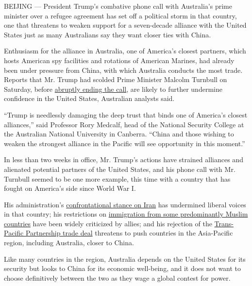 BEIJING --- President Trump's combative phone call with Australia's
prime minister over a refugee agreement has set off a political storm in
that country, one that threatens to weaken support for a seven-decade
alliance with the United States just as many Australians say they want
closer ties with China.

Enthusiasm for the alliance in Australia, one of America's closest
partners, which hosts American spy facilities and rotations of American
Marines, had already been under pressure from China, with which
Australia conducts the most trade. Reports that Mr. Trump had scolded
Prime Minister Malcolm Turnbull on Saturday, before
\href{https://www.nytimes.com/2017/02/02/us/politics/us-australia-trump-turnbull.html?hp\&action=click\&pgtype=Homepage\&clickSource=story-heading\&module=a-lede-package-region\&region=top-news\&WT.nav=top-news}{abruptly
ending the call}, are likely to further undermine confidence in the
United States, Australian analysts said.

``Trump is needlessly damaging the deep trust that binds one of
America's closest alliances,'' said Professor Rory Medcalf, head of the
National Security College at the Australian National University in
Canberra. ``China and those wishing to weaken the strongest alliance in
the Pacific will see opportunity in this moment.''

In less than two weeks in office, Mr. Trump's actions have strained
alliances and alienated potential partners of the United States, and his
phone call with Mr. Turnbull seemed to be one more example, this time
with a country that has fought on America's side since World War I.

His administration's
\href{https://www.nytimes.com/2017/02/01/world/middleeast/iran-missile-test.html}{confrontational
stance on Iran} has undermined liberal voices in that country; his
restrictions on
\href{https://www.nytimes.com/2017/01/27/us/politics/trump-syrian-refugees.html}{immigration
from some predominantly Muslim countries} have been widely criticized by
allies; and his rejection of the
\href{https://www.nytimes.com/2017/01/23/us/politics/tpp-trump-trade-nafta.html}{Trans-Pacific
Partnership trade deal} threatens to push countries in the Asia-Pacific
region, including Australia, closer to China.

Like many countries in the region, Australia depends on the United
States for its security but looks to China for its economic well-being,
and it does not want to choose definitively between the two as they wage
a global contest for power.

